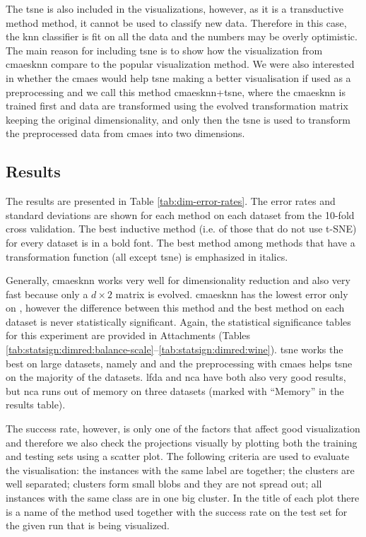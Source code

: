\documentclass[12pt,a4paper]{report}
\begin{document}
The \ac{tsne} is also included in the visualizations, however, as it is a transductive method method, it cannot be used to classify new data. Therefore in this case, the \ac{knn} classifier is fit on all the data and the numbers may be overly optimistic. The main reason for including \ac{tsne} is to show how the visualization from \ac{cmaesknn} compare to the popular visualization method. We were also interested in whether the \ac{cmaes} would help \ac{tsne} making a better visualisation if used as a preprocessing and we call this method \ac{cmaesknn}+\ac{tsne}, where the \ac{cmaesknn} is trained first and data are transformed using the evolved transformation matrix keeping the original dimensionality, and only then the \ac{tsne} is used to transform the preprocessed data from \ac{cmaes} into two dimensions.

\subsection{Results}

The results are presented in Table \ref{tab:dim-error-rates}. The error rates and standard deviations are shown for each method on each dataset from the 10-fold cross validation. The best inductive method (i.e. of those that do not use t-SNE) for every dataset is in a bold font. The best method among methods that have a transformation function (all except \ac{tsne}) is emphasized in italics.

Generally, \ac{cmaesknn} works very well for dimensionality reduction and also very fast because only a $d\times2$ matrix is evolved. \ac{cmaesknn} has the lowest error only on , however the difference between this method and the best method on each dataset is never statistically significant. Again, the statistical significance tables for this experiment are provided in Attachments (Tables \ref{tab:statsign:dimred:balance-scale}--\ref{tab:statsign:dimred:wine}). \ac{tsne} works the best on large datasets, namely  and  and the preprocessing with \ac{cmaes} helps \ac{tsne} on the majority of the datasets. \ac{lfda} and \ac{nca} have both also very good results, but \ac{nca} runs out of memory on three datasets (marked with ``Memory'' in the results table).



The success rate, however, is only one of the factors that affect good visualization and therefore we also check the projections visually by plotting both the training and testing sets using a scatter plot. The following criteria are used to evaluate the visualisation: the instances with the same label are together; the clusters are well separated; clusters form small blobs and they are not spread out; all instances with the same class are in one big cluster. In the title of each plot there is a name of the method used together with the success rate on the test set for the given run that is being visualized.
\end{document}

